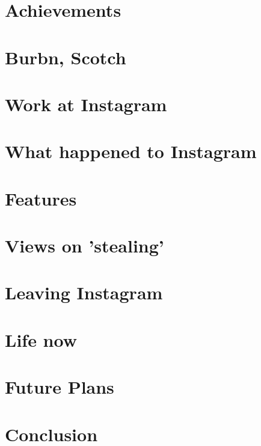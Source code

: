 \documentclass[12pt]{article}
\begin{document}
    \section{Achievements}
    \section{Burbn, Scotch}
    \section{Work at Instagram}
    \section{What happened to Instagram}
    \section{Features}
    \section{Views on 'stealing'}
    \section{Leaving Instagram}
    \section{Life now}
    \section{Future Plans}

    \section{Conclusion}
\end{document}
